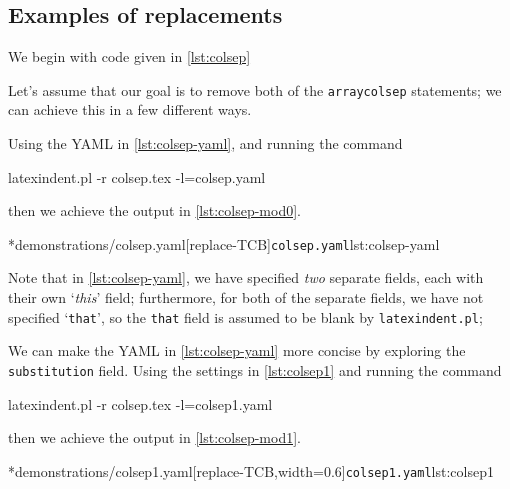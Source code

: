 \subsection{Examples of replacements}
	\begin{example}
		We begin with code given in \cref{lst:colsep}


		Let's assume that our goal is to remove both of the \texttt{arraycolsep} statements; we can achieve this in
		a few different ways.

		Using the YAML in \cref{lst:colsep-yaml}, and running the command
		\begin{commandshell}
latexindent.pl -r colsep.tex -l=colsep.yaml
\end{commandshell}
		then we achieve the output in \cref{lst:colsep-mod0}.
		\begin{cmhtcbraster}[raster column skip=.01\linewidth]
			\cmhlistingsfromfile[style=yaml-LST]*{demonstrations/colsep.yaml}[replace-TCB]{\texttt{colsep.yaml}}{lst:colsep-yaml}
		\end{cmhtcbraster}
		Note that in \cref{lst:colsep-yaml}, we have specified \emph{two} separate fields, each with their own `\emph{this}' field;
		furthermore, for both of the separate fields, we have not specified `\texttt{that}', so the \texttt{that} field
		is assumed to be blank by \texttt{latexindent.pl};

		We can make the YAML in \cref{lst:colsep-yaml} more concise by exploring the \texttt{substitution} field. Using
		the settings in \cref{lst:colsep1} and running the command
		\begin{commandshell}
latexindent.pl -r colsep.tex -l=colsep1.yaml
\end{commandshell}
		then we achieve the output in \cref{lst:colsep-mod1}.
		\begin{cmhtcbraster}[raster column skip=.01\linewidth,
				raster force size=false,
				raster column 1/.style={add to width=-.1\textwidth}]
			\cmhlistingsfromfile[style=yaml-LST]*{demonstrations/colsep1.yaml}[replace-TCB,width=0.6\textwidth]{\texttt{colsep1.yaml}}{lst:colsep1}
		\end{cmhtcbraster}


\end{example}
